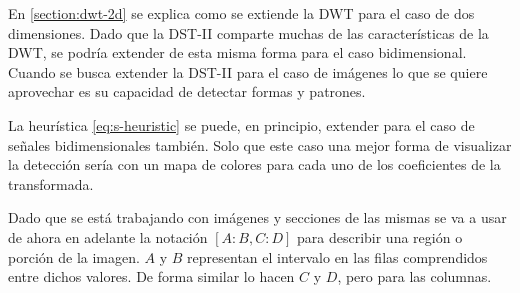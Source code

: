 En \ref{section:dwt-2d} se explica como se extiende la DWT para el caso de dos dimensiones. Dado que la DST-II comparte 
muchas de las características de la DWT, se podría extender de esta misma forma para el caso bidimensional.
Cuando se busca extender la DST-II para el caso de imágenes lo que se quiere aprovechar es su capacidad
de detectar formas y patrones. 

La heurística \ref{eq:s-heuristic} se puede, en principio, extender para el caso de señales bidimensionales también.
Solo que este caso una mejor forma de visualizar la detección sería con un mapa de colores para cada uno de los coeficientes
de la transformada.

Dado que se está trabajando con imágenes y secciones de las mismas se va a usar de ahora en adelante la notación
$[A:B,C:D]$ para describir una región o porción de la imagen. $A$ y $B$ representan el intervalo en las filas
comprendidos entre dichos valores. De forma similar lo hacen $C$ y $D$, pero para las columnas.



